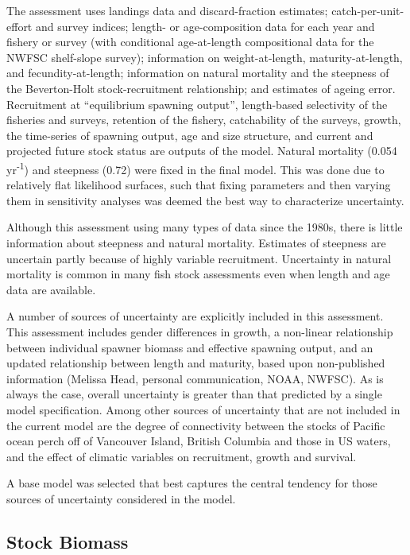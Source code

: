 \documentclass[12pt,]{article}
\begin{document}
The assessment uses landings data and discard-fraction estimates;
catch-per-unit-effort and survey indices; length- or age-composition
data for each year and fishery or survey (with conditional age-at-length
compositional data for the NWFSC shelf-slope survey); information on
weight-at-length, maturity-at-length, and fecundity-at-length;
information on natural mortality and the steepness of the Beverton-Holt
stock-recruitment relationship; and estimates of ageing error.
Recruitment at ``equilibrium spawning output'', length-based selectivity
of the fisheries and surveys, retention of the fishery, catchability of
the surveys, growth, the time-series of spawning output, age and size
structure, and current and projected future stock status are outputs of
the model. Natural mortality (0.054 yr\textsuperscript{-1}) and
steepness (0.72) were fixed in the final model. This was done due to
relatively flat likelihood surfaces, such that fixing parameters and
then varying them in sensitivity analyses was deemed the best way to
characterize uncertainty.

Although this assessment using many types of data since the 1980s, there
is little information about steepness and natural mortality. Estimates
of steepness are uncertain partly because of highly variable
recruitment. Uncertainty in natural mortality is common in many fish
stock assessments even when length and age data are available.

A number of sources of uncertainty are explicitly included in this
assessment. This assessment includes gender differences in growth, a
non-linear relationship between individual spawner biomass and effective
spawning output, and an updated relationship between length and
maturity, based upon non-published information (Melissa Head, personal
communication, NOAA, NWFSC). As is always the case, overall uncertainty
is greater than that predicted by a single model specification. Among
other sources of uncertainty that are not included in the current model
are the degree of connectivity between the stocks of Pacific ocean perch
off of Vancouver Island, British Columbia and those in US waters, and
the effect of climatic variables on recruitment, growth and survival.

A base model was selected that best captures the central tendency for
those sources of uncertainty considered in the model.

\subsection*{Stock Biomass}\label{stock-biomass}
\end{document}
